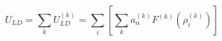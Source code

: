 


$$
U_{LD} = \sum_k U_{LD}^{(k)} = \sum_i \left[ \sum_k a_\alpha^{(k)} F^{(k)} \left(\rho_i^{(k)}\right) \right] 
$$


